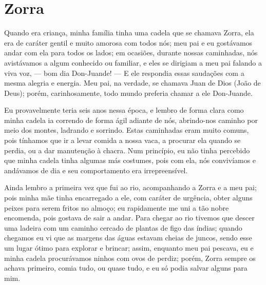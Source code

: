 \cleardoublepage
\newpage
{}
\chapter{Zorra}
Quando era criança, minha família tinha uma cadela que se chamava Zorra, ela era de caráter gentil e muito amorosa com todos nós; meu pai e eu gostávamos andar com ela para todos os lados; em ocasiões, durante nossas caminhadas, nós avistávamos a algum conhecido ou familiar, e eles se dirigiam a meu pai falando a viva voz, --- bom dia Don-Juande! --- E ele respondia essas saudações com a mesma alegria e energia.
Meu pai, na verdade, se chamava Juan de Dios (João de Deus); porém, carinhosamente, todo mundo preferia chamar a ele Don-Juande.

Eu provavelmente teria seis anos nessa época, e lembro de forma clara como minha cadela ia correndo de forma ágil adiante de nós, abrindo-nos caminho por meio dos montes, ladrando e sorrindo.
Estas caminhadas eram muito comuns, pois tínhamos que ir a levar comida a nossa vaca, a procurar ela quando se perdia, ou a dar manutenção à chacra.
Num princípio, eu não tinha percebido que minha cadela tinha algumas más costumes, pois com ela, nós convivíamos e andávamos de dia e seu comportamento era irrepreensível. 

Ainda lembro a primeira vez que fui ao rio, acompanhando a Zorra e a meu pai; pois minha mãe tinha encarregado a ele, com caráter de urgência, obter alguns peixes para serem fritos no almoço; eu rapidamente me uni a tão nobre encomenda, pois gostava de sair a andar. 
Para chegar ao rio tivemos que descer uma ladeira com um caminho cercado de plantas de figo das índias; quando chegamos eu vi que as margens das águas estavam cheias de juncos, sendo esse um lugar ótimo para explorar e brincar; assim, enquanto meu pai pescava, eu e minha cadela procurávamos ninhos com ovos de perdiz; porém, Zorra sempre os achava primeiro, comia tudo, ou quase tudo, e eu só podia salvar alguns para mim.


